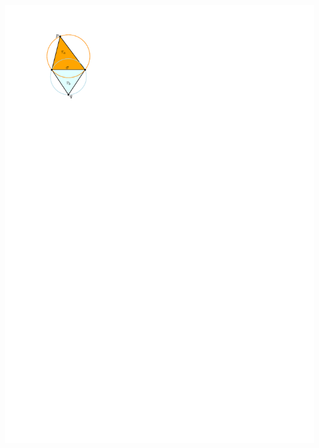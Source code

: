 \begin{marginfigure}
  \centering
  \includegraphics[width=\textwidth,page=1]{figs/local}

\end{marginfigure}
